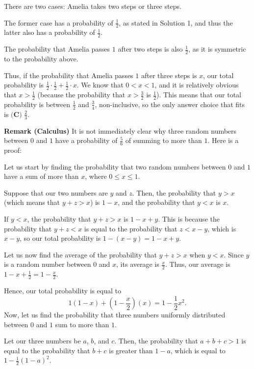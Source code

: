 \begin{enumerate}
There are two cases: Amelia takes two steps or three steps. 

 The former case has a probability of $\frac{1}{2}$, as stated in Solution 1, and thus the latter also has a probability of $\frac{1}{2}$. 

 The probability that Amelia passes $1$ after two steps is also $\frac{1}{2}$, as it is symmetric to the probability above.

 Thus, if the probability that Amelia passes $1$ after three steps is $x$, our total probability is $\frac{1}{2} \cdot \frac{1}{2} + \frac{1}{2} \cdot x$. We know that $0 < x < 1$, and it is relatively obvious that $x > \frac{1}{2}$ (because the probability that $x > \frac{3}{2}$ is $\frac{1}{2}$). This means that our total probability is between $\frac{1}{2}$ and $\frac{3}{4}$, non-inclusive, so the only answer choice that fits is $\boxed{\textbf{(C) }\frac{2}{3}}$.

 \textbf{Remark (Calculus)} It is not immediately clear why three random numbers between $0$ and $1$ have a probability of $\frac{5}{6}$ of summing to more than $1$. Here is a proof:

 Let us start by finding the probability that two random numbers between $0$ and $1$ have a sum of more than $x$, where $0 \leq x \leq 1$. 

 Suppose that our two numbers are $y$ and $z$. Then, the probability that $y > x$ (which means that $y + z > x$) is $1 - x$, and the probability that $y < x$ is $x$.

 If $y < x$, the probability that $y + z > x$ is $1 - x + y$. This is because the probability that $y + z < x$ is equal to the probability that $z < x - y$, which is $x - y$, so our total probability is $1 - (x - y) = 1 - x + y$.

 Let us now find the average of the probability that $y + z > x$ when $y < x$. Since $y$ is a random number between $0$ and $x$, its average is $\frac{x}{2}$. Thus, our average is $1 - x + \frac{1}{2} = 1 - \frac{x}{2}$. 

 Hence, our total probability is equal to 
 \[1(1-x) + \left(1 - \frac{x}{2}\right)(x) = 1 - \frac{1}{2}x^2.\]Now, let us find the probability that three numbers uniformly distributed between $0$ and $1$ sum to more than $1$.

 Let our three numbers be $a$, $b$, and $c$. Then, the probability that $a + b + c > 1$ is equal to the probability that $b + c$ is greater than $1 - a$, which is equal to $1 - \frac{1}{2}(1 - a)^2$. 


\end{enumerate}
